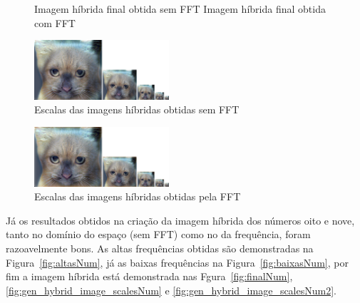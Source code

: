  
 \begin{figure}[H]
    \centering
    \caption[]{ Imagem híbrida final obtida sem FFT { Imagem híbrida final obtida com FFT}}
    \label{fig:final}
\end{figure}

\begin{figure}[H]
    \centering
    \includegraphics[width=5cm]{gen_hybrid_image/hybrid_image_scales.jpg}
    \caption{Escalas das imagens híbridas obtidas sem FFT}
    \label{fig:gen_hybrid_image_scales}
\end{figure}

\begin{figure}[H]
    \centering
    \includegraphics[width=5cm]{gen_hybrid_image/hybrid_image_scales_fft.jpg}
    \caption{Escalas das imagens híbridas obtidas pela FFT}
    \label{fig:gen_hybrid_image_scales_fft}
\end{figure}

Já os resultados obtidos na criação da imagem híbrida dos números oito e nove, tanto no domínio do espaço (sem FFT) como no da frequência, foram razoavelmente bons. As altas frequências obtidas são demonstradas na Figura~\ref{fig:altasNum}, já as baixas frequências na Figura~\ref{fig:baixasNum}, por fim a imagem híbrida está demonstrada nas Fgura~\ref{fig:finalNum}, \ref{fig:gen_hybrid_image_scalesNum} e \ref{fig:gen_hybrid_image_scalesNum2}.

